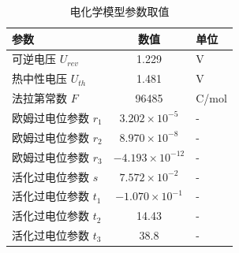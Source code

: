 \begin{table}[!htbp]
  \centering
  \caption{电化学模型参数取值}
  \label{tab:params_electrochem}
  \small
  \begin{tabular}{@{}l c l@{}}
    \toprule
    \textbf{参数} & \textbf{数值} & \textbf{单位} \\
    \midrule
    可逆电压 $U_{rev}$ & 1.229 & V \\
    热中性电压 $U_{th}$ & 1.481 & V \\
    法拉第常数 $F$ & 96485 & C/mol \\
    \addlinespace
    欧姆过电位参数 $r_1$ & $3.202 \times 10^{-5}$ & - \\
    欧姆过电位参数 $r_2$ & $8.970 \times 10^{-8}$ & - \\
    欧姆过电位参数 $r_3$ & $-4.193 \times 10^{-12}$ & - \\
    \addlinespace
    活化过电位参数 $s$ & $7.572 \times 10^{-2}$ & - \\
    活化过电位参数 $t_1$ & $-1.070 \times 10^{-1}$ & - \\
    活化过电位参数 $t_2$ & 14.43 & - \\
    活化过电位参数 $t_3$ & 38.8 & - \\
    \bottomrule
  \end{tabular}
\end{table}

